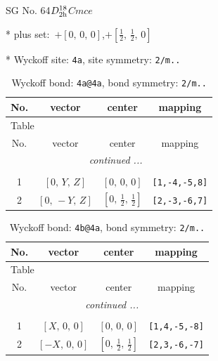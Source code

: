 \documentclass[fleqn,8pt]{jsarticle}
\begin{document}
\setcounter{MaxMatrixCols}{32}

\renewcommand{\tablename}{Table~}
\renewcommand{\figurename}{Figure~}
\begin{center}
\LARGE
SG No. 64\quad$D_{\rm 2h}^{18}$\quad$Cmce$\quad[ orthorhombic ]
\end{center}

* plus set:\,\,\,$+\left[ 0,\, 0,\, 0 \right]$,\quad $+\left[ \frac{1}{2},\, \frac{1}{2},\, 0 \right]$


* Wyckoff site: {\tt 4a}, site symmetry: {\tt 2/m..}
\renewcommand{\arraystretch}{1.2}
\begin{longtable}{cccc}
\caption{Wyckoff bond: {\tt 4a@4a}, bond symmetry: {\tt 2/m..}}
 \\
 \hline \hline
No. & vector & center & mapping \\ \hline \endfirsthead

\multicolumn{3}{l}{\tablename\ \thetable{}} \\
 \hline \hline
No. & vector & center & mapping \\ \hline \endhead

 \hline \hline
\multicolumn{3}{r}{\footnotesize\it continued ...} \\ \endfoot

 \hline \hline
\multicolumn{3}{r}{} \\ \endlastfoot

1 & $\left[ 0,\, Y,\, Z \right]$ & $\left[ 0,\, 0,\, 0 \right]$ & {\tt [1,-4,-5,8]} \\ \hline
2 & $\left[ 0,\, - Y,\, Z \right]$ & $\left[ 0,\, \frac{1}{2},\, \frac{1}{2} \right]$ & {\tt [2,-3,-6,7]} \\
\end{longtable}
\renewcommand{\arraystretch}{1.2}
\begin{longtable}{cccc}
\caption{Wyckoff bond: {\tt 4b@4a}, bond symmetry: {\tt 2/m..}}
 \\
 \hline \hline
No. & vector & center & mapping \\ \hline \endfirsthead

\multicolumn{3}{l}{\tablename\ \thetable{}} \\
 \hline \hline
No. & vector & center & mapping \\ \hline \endhead

 \hline \hline
\multicolumn{3}{r}{\footnotesize\it continued ...} \\ \endfoot

 \hline \hline
\multicolumn{3}{r}{} \\ \endlastfoot

1 & $\left[ X,\, 0,\, 0 \right]$ & $\left[ 0,\, 0,\, 0 \right]$ & {\tt [1,4,-5,-8]} \\ \hline
2 & $\left[ - X,\, 0,\, 0 \right]$ & $\left[ 0,\, \frac{1}{2},\, \frac{1}{2} \right]$ & {\tt [2,3,-6,-7]} \\
\end{longtable}
\end{document}
